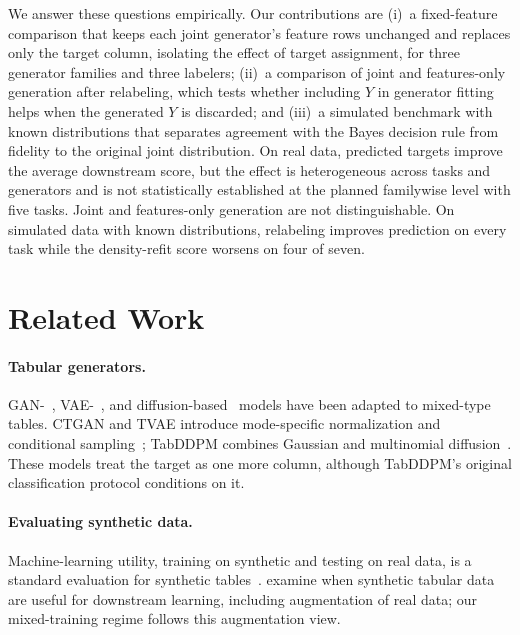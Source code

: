 \documentclass[letterpaper]{article}
\begin{document}
We answer these questions empirically. Our contributions are
(i)~a fixed-feature comparison that keeps each joint generator's feature
rows unchanged and replaces only the target column, isolating the effect of
target assignment, for three generator families and three labelers;
(ii)~a comparison of joint and features-only generation after relabeling,
which tests whether including $Y$ in generator fitting helps when the
generated $Y$ is discarded; and (iii)~a simulated benchmark with known distributions that separates agreement with the Bayes
decision rule from fidelity to the original joint distribution.
On real data, predicted targets improve the average downstream score, but
the effect is heterogeneous across tasks and generators and is not
statistically established at the planned familywise level with five tasks.
Joint and features-only generation are not distinguishable. On simulated
data with known distributions, relabeling improves prediction on every task while the
density-refit score worsens on four of seven.

\section{Related Work}
\paragraph{Tabular generators.} GAN-~\citep{goodfellow2014gan},
VAE-~\citep{kingma2014vae}, and diffusion-based~\citep{ho2020ddpm} models
have been adapted to mixed-type tables. CTGAN and TVAE introduce
mode-specific normalization and conditional sampling~\citep{xu2019ctgan};
TabDDPM combines Gaussian and multinomial diffusion~\citep{kotelnikov2023tabddpm}.
These models treat the target as one more column, although TabDDPM's
original classification protocol conditions on it.

\paragraph{Evaluating synthetic data.} Machine-learning utility, training on
synthetic and testing on real data, is a standard evaluation for synthetic
tables~\citep{xu2019ctgan}. \citet{manousakas2023usefulness} examine
when synthetic tabular data are useful for downstream learning, including
augmentation of real data; our mixed-training regime follows this
augmentation view.
\end{document}
